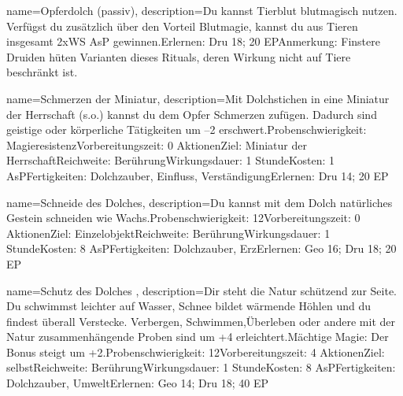 {
    name={Opferdolch (passiv)},
    description={Du kannst Tierblut blutmagisch nutzen. Verfügst du zusätzlich über den Vorteil Blutmagie, kannst du aus Tieren insgesamt 2xWS AsP gewinnen.\newline Erlernen: Dru 18; 20 EP\newline Anmerkung: Finstere Druiden hüten Varianten dieses Rituals, deren Wirkung nicht auf Tiere beschränkt ist.}
}


{
    name={Schmerzen der Miniatur},
    description={Mit Dolchstichen in eine Miniatur der Herrschaft (s.o.) kannst du dem Opfer Schmerzen zufügen. Dadurch sind geistige oder körperliche Tätigkeiten um –2 erschwert.\newline Probenschwierigkeit: Magieresistenz\newline Vorbereitungszeit: 0 Aktionen\newline Ziel: Miniatur der Herrschaft\newline Reichweite: Berührung\newline Wirkungsdauer: 1 Stunde\newline Kosten: 1 AsP\newline Fertigkeiten: Dolchzauber, Einfluss, Verständigung\newline Erlernen: Dru 14; 20 EP}
}


{
    name={Schneide des Dolches},
    description={Du kannst mit dem Dolch natürliches Gestein schneiden wie Wachs.\newline Probenschwierigkeit: 12\newline Vorbereitungszeit: 0 Aktionen\newline Ziel: Einzelobjekt\newline Reichweite: Berührung\newline Wirkungsdauer: 1 Stunde\newline Kosten: 8 AsP\newline Fertigkeiten: Dolchzauber, Erz\newline Erlernen: Geo 16; Dru 18; 20 EP}
}


{
    name={Schutz des Dolches },
    description={Dir steht die Natur schützend zur Seite. Du schwimmst leichter auf Wasser, Schnee bildet wärmende Höhlen und du findest überall Verstecke. Verbergen, Schwimmen,\newline Überleben oder andere mit der Natur zusammenhängende Proben sind um +4 erleichtert.\newline Mächtige Magie: Der Bonus steigt um +2.\newline Probenschwierigkeit: 12\newline Vorbereitungszeit: 4 Aktionen\newline Ziel: selbst\newline Reichweite: Berührung\newline Wirkungsdauer: 1 Stunde\newline Kosten: 8 AsP\newline Fertigkeiten: Dolchzauber, Umwelt\newline Erlernen: Geo 14; Dru 18; 40 EP}
}


